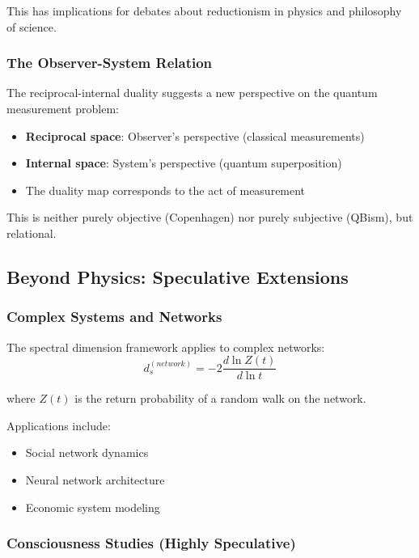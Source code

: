 This has implications for debates about reductionism in physics and philosophy of science.

\subsubsection{The Observer-System Relation}

The reciprocal-internal duality suggests a new perspective on the quantum measurement problem:
\begin{itemize}
    \item \textbf{Reciprocal space}: Observer's perspective (classical measurements)
    \item \textbf{Internal space}: System's perspective (quantum superposition)
    \item The duality map corresponds to the act of measurement
\end{itemize}

This is neither purely objective (Copenhagen) nor purely subjective (QBism), but relational.

\subsection{Beyond Physics: Speculative Extensions}

\subsubsection{Complex Systems and Networks}

The spectral dimension framework applies to complex networks:
\begin{equation}
    d_s^{(network)} = -2 \frac{d\ln Z(t)}{d\ln t}
\end{equation}

where $Z(t)$ is the return probability of a random walk on the network.

Applications include:
\begin{itemize}
    \item Social network dynamics
    \item Neural network architecture
    \item Economic system modeling
\end{itemize}

\subsubsection{Consciousness Studies (Highly Speculative)}

